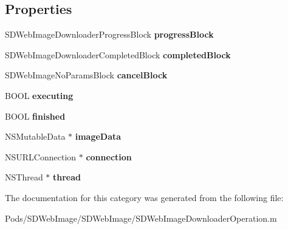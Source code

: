 \subsection*{Properties}
\begin{DoxyCompactItemize}
\item 
\mbox{\label{category_s_d_web_image_downloader_operation_07_08_a5a11edcffddb0b1ab8e73acf84e2e119}} 
S\+D\+Web\+Image\+Downloader\+Progress\+Block {\bfseries progress\+Block}
\item 
\mbox{\label{category_s_d_web_image_downloader_operation_07_08_a79d749d78b081a251afff0fef2fe002d}} 
S\+D\+Web\+Image\+Downloader\+Completed\+Block {\bfseries completed\+Block}
\item 
\mbox{\label{category_s_d_web_image_downloader_operation_07_08_adc377b055d23f796fa74f8c4a4c3268f}} 
S\+D\+Web\+Image\+No\+Params\+Block {\bfseries cancel\+Block}
\item 
\mbox{\label{category_s_d_web_image_downloader_operation_07_08_a2728a4f37b9c84db6e13d172e3e64d3a}} 
B\+O\+OL {\bfseries executing}
\item 
\mbox{\label{category_s_d_web_image_downloader_operation_07_08_a0ec2440fa7ec97890db2250ade7e5f15}} 
B\+O\+OL {\bfseries finished}
\item 
\mbox{\label{category_s_d_web_image_downloader_operation_07_08_a8ff2ab0970f466ec203f53b3e868c355}} 
N\+S\+Mutable\+Data $\ast$ {\bfseries image\+Data}
\item 
\mbox{\label{category_s_d_web_image_downloader_operation_07_08_aecbc22ceed56acd75edeb8d9f18d50a7}} 
N\+S\+U\+R\+L\+Connection $\ast$ {\bfseries connection}
\item 
\mbox{\label{category_s_d_web_image_downloader_operation_07_08_a1ff5be79d7b8383baf092f284c92412a}} 
N\+S\+Thread $\ast$ {\bfseries thread}
\end{DoxyCompactItemize}


The documentation for this category was generated from the following file\+:\begin{DoxyCompactItemize}
\item 
Pods/\+S\+D\+Web\+Image/\+S\+D\+Web\+Image/S\+D\+Web\+Image\+Downloader\+Operation.\+m\end{DoxyCompactItemize}
